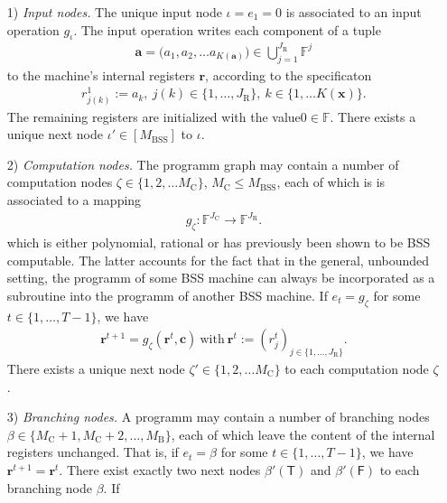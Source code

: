 \documentclass[conference]{IEEEtran}
\def\FF{{\mathbb F}}
\newcommand{\BSS}{\mathrm{BSS}}
\begin{document}
	\begin{itemize}	\item[1)] \emph{Input nodes.} The unique input node \(\iota = e_1 = 0\) is associated to an 
						input operation \(g_\iota\). The input operation writes each component of a tuple 
						\begin{align*} 	\bm{a} = \big(a_1,a_2,\ldots a_{K({\bm{a}})}\big) \in \bigcup_{j=1}^{J_{\mathrm{R}}} \FF^{j}
						\end{align*}
						to the machine's internal registers \(\bm{r}\), according to the specificaton
						\begin{align*}	r^1_{j(k)} := a_k ,~ j(k)\in \{1,\ldots,J_{\mathrm{R}}\},~ k\in \{1,\ldots K(\bm{x})\}.   
						\end{align*}
						The remaining registers are initialized with the value\linebreak \(0 \in \FF\).
						There exists a unique next node \(\iota' \in [M_\BSS]\) to \(\iota\).
					\item[2)] \emph{Computation nodes.} The programm graph may contain a number of computation nodes \(\zeta \in \{1,2,\ldots M_{\mathrm{C}}\}\),    
						\linebreak \(M_{\mathrm{C}} \leq M_{\BSS}\), each of which is 
						is associated to a mapping 
						\begin{align*} 	g_\zeta : \FF^{J_{\mathrm{C}}}\rightarrow \FF^{J_{\mathrm{R}}}. 
						\end{align*} 
						which is either polynomial, rational or has previously been shown to be BSS computable. The latter accounts for the fact that in the general, 
						unbounded setting, the programm of some BSS machine can always be incorporated as a subroutine into the programm of another BSS machine.
						If \(e_t = g_\zeta\) for some \(t\in\{1,\ldots, T-1\}\), we have
						\begin{align*}  \bm{r}^{t+1} = g_{\zeta}(\bm{r}^t,\bm{c})~\text{with}~\bm{r}^t := (r_j^t)_{j\in\{1,\ldots,J_{\mathrm{R}}\}}.
						\end{align*}
						There exists a unique next node \(\zeta' \in \{1,2,\ldots M_{\mathrm{C}}\}\) to each computation node \(\zeta\).
					\item[3)] \emph{Branching nodes.}  A programm may contain a number of branching nodes \(\beta \in \{M_{\mathrm{C}} + 1, M_{\mathrm{C}} + 2,\ldots, M_\mathrm{B}\}\), 
						each of which leave the content of the internal registers unchanged. That is, if \(e_t = \beta\) for some \(t\in\{1,\ldots, T-1\}\), we have
						\(\bm{r}^{t+1} = \bm{r}^{t}\). There exist exactly two next nodes \(\beta'(\mathsf{T})\) and \(\beta'(\mathsf{F})\) to each branching node \(\beta\). If 

\end{itemize}
\end{document}
